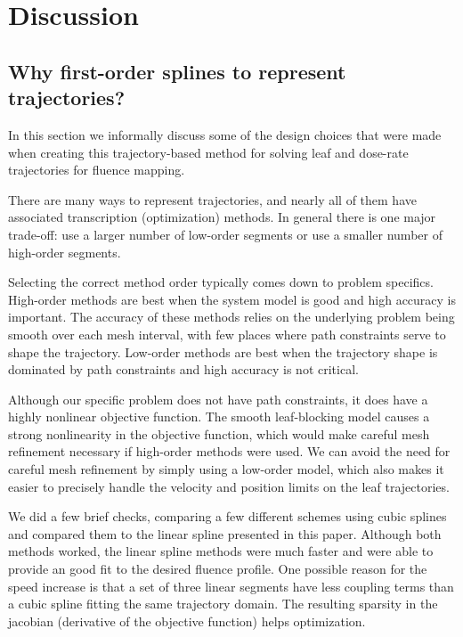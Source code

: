 \section{Discussion}

\subsection{Why first-order splines to represent trajectories?}
\label{sec:WhyUseLinearSplines}

In this section we informally discuss some of the design choices that were made when creating this
trajectory-based method for solving leaf and dose-rate trajectories for fluence mapping.


There are many ways to represent trajectories, and nearly all of them have associated transcription (optimization) methods.
In general there is one major trade-off:
use a larger number of low-order segments or
use a smaller number of high-order segments.

Selecting the correct method order typically comes down to problem specifics.
High-order methods are best when the system model is good and high accuracy is important.
The accuracy of these methods relies on the underlying problem being smooth over each
mesh interval, with few places where path constraints serve to shape the trajectory.
Low-order methods are best when the trajectory shape is dominated by path constraints and
high accuracy is not critical.

Although our specific problem does not have path constraints, it does have a highly nonlinear objective function.
The smooth leaf-blocking model causes a strong nonlinearity in the objective function,
which would make careful mesh refinement necessary if high-order methods were used.
We can avoid the need for careful mesh refinement by simply using a low-order model,
which also makes it easier to precisely handle the velocity and position limits on the leaf trajectories.

We did a few brief checks, comparing a few different schemes using cubic splines and compared them
to the linear spline presented in this paper. Although both methods worked, the linear spline methods
were much faster and were able to provide an good fit to the desired fluence profile.
One possible reason for the speed increase is that a set of three linear segments have less
coupling terms than a cubic spline fitting the same trajectory domain. The resulting sparsity in the
jacobian (derivative of the objective function) helps optimization. \cite{Betts}

